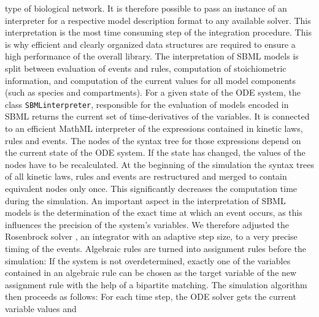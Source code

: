 \documentclass{bioinfo}
\newcommand{\SBMLinterpreter}{\texttt{SBML\-interpreter}}
\begin{document}
\begin{methods}
type of biological network. It is therefore possible to pass an instance of an
interpreter for a respective model description format to any available solver.
%
This interpretation is the most time consuming step of the integration procedure.
This is why efficient and clearly organized data structures are required to
ensure a high performance of the overall library. The interpretation of SBML
models is split between evaluation of events and rules, computation of
stoichiometric information, and computation of the current values for all model
components (such as species and compartments).
%
For a given state of the ODE system, the class \SBMLinterpreter, responsible
for the evaluation of models encoded in SBML returns the current set of
time-derivatives of the variables.
It is connected to an efficient MathML interpreter of the expressions contained
in kinetic laws, rules and events. The nodes of the syntax tree for those
expressions depend on the current state of the ODE system. If the state has
changed, the values of the nodes have to be recalculated.
At the beginning of the simulation the syntax trees of all kinetic laws, rules
and events are restructured and merged to contain equivalent nodes only once.
This significantly decreases the computation time during the simulation.
%
An important aspect in the interpretation of SBML models is the
determination of the exact time at which an event occurs, as this influences
the precision of the system's variables. We therefore adjusted the Rosenbrock
solver \citep{Kotcon2011}, an integrator with an adaptive step size, to a very
precise timing of the events.
%
Algebraic rules are turned into assignment rules before the
simulation: If the system is not overdetermined, exactly one of the variables
contained in an algebraic rule can be chosen as the target variable of the
new assignment rule with the help of a bipartite matching.
%
The simulation algorithm then proceeds as follows: For each time step, the ODE
solver gets the current variable values and

\end{methods}
\end{document}
